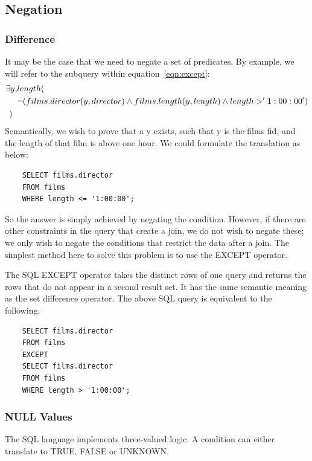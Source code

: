 \documentclass[a4paper, 11pt]{article}
\begin{document}
  \subsection{Negation}

    \subsubsection{Difference}
    \label{sec:except}

    It may be the case that we need to negate a set of predicates. By example,
    we will refer to the subquery within
    equation~\ref{eqn:except}:
    \begin{align*}
      \exists y,& length( \\
      &\lnot(films.director(y, director) \land films.length(y, length) \land length > '1:00:00') \\
      ) \hspace{2mm} &
    \end{align*}
    Semantically, we wish to prove that a y exists, such that y is the films
    fid, and the length of that film is above one hour. We could formulate the
    translation as below:
    \begin{verbatim}
    SELECT films.director
    FROM films
    WHERE length <= '1:00:00';
    \end{verbatim}
    So the answer is simply achieved by negating the condition. However, if
    there are other constraints in the query that create a join, we do not wish
    to negate these; we only wish to negate the conditions that restrict the
    data after a join. The simplest method here to solve this problem is to use
    the EXCEPT operator.

    The SQL EXCEPT operator takes the distinct rows of one query and returns
    the rows that do not appear in a second result set\cite{wiki:EXCEPT}. It
    has the same semantic meaning as the set difference operator. The
    above SQL query is equivalent to the following.

    \begin{verbatim}
    SELECT films.director
    FROM films
    EXCEPT
    SELECT films.director
    FROM films
    WHERE length > '1:00:00';
    \end{verbatim}

  \subsubsection{NULL Values}
    The SQL language implements three-valued logic. A condition can either
    translate to TRUE, FALSE or UNKNOWN.
\end{document}
